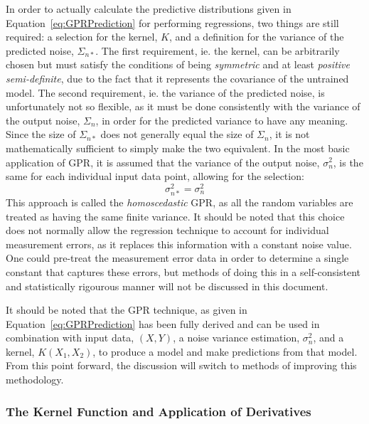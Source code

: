 \documentclass{article}
\begin{document}
In order to actually calculate the predictive distributions given in Equation~\eqref{eq:GPRPrediction} for performing regressions, two things are still required: a selection for the kernel, $K$, and a definition for the variance of the predicted noise, $\Sigma_{n*}$. The first requirement, ie. the kernel, can be arbitrarily chosen but must satisfy the conditions of being \emph{symmetric} and at least \emph{positive semi-definite}, due to the fact that it represents the covariance of the untrained model. The second requirement, ie. the variance of the predicted noise, is unfortunately not so flexible, as it must be done consistently with the variance of the output noise, $\Sigma_n$, in order for the predicted variance to have any meaning. Since the size of $\Sigma_{n*}$ does not generally equal the size of $\Sigma_n$, it is not mathematically sufficient to simply make the two equivalent. In the most basic application of GPR, it is assumed that the variance of the output noise, $\sigma_n^2$, is the same for each individual input data point, allowing for the selection:
\begin{equation}
\label{eq:ConstantPredictiveNoise}
	\sigma_{n*}^2 = \sigma_n^2
\end{equation}
This approach is called the \emph{homoscedastic} GPR, as all the random variables are treated as having the same finite variance. It should be noted that this choice does not normally allow the regression technique to account for individual measurement errors, as it replaces this information with a constant noise value. One could pre-treat the measurement error data in order to determine a single constant that captures these errors, but methods of doing this in a self-consistent and statistically rigourous manner will not be discussed in this document.

It should be noted that the GPR technique, as given in Equation~\eqref{eq:GPRPrediction} has been fully derived and can be used in combination with input data, $\left(X,Y\right)$, a noise variance estimation, $\sigma_n^2$, and a kernel, $K\!\left(X_1,X_2\right)$, to produce a model and make predictions from that model. From this point forward, the discussion will switch to methods of improving this methodology.

\subsubsection{The Kernel Function and Application of Derivatives}
\label{subsubsec:GPRKernelFunction}
\end{document}
